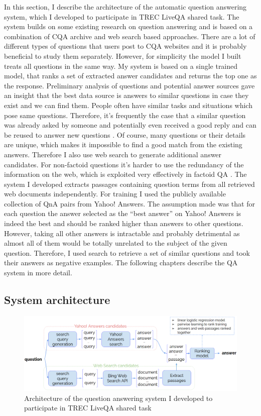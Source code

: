 In this section, I describe the architecture of the automatic question answering system, which I developed to participate in TREC LiveQA shared task.
The system builds on some existing research on question answering and is based on a combination of CQA archive and web search based approaches.
There are a lot of different types of questions that users post to CQA websites and it is probably beneficial to study them separately.
However, for simplicity the model I built treats all questions in the same way.
My system is based on a single trained model, that ranks a set of extracted answer candidates and returns the top one as the response.
Preliminary analysis of questions and potential answer sources gave an insight that the best data source is answers to similar questions in case they exist and we can find them.
People often have similar tasks and situations which pose same questions.
Therefore, it's frequently the case that a similar question was already asked by someone and potentially even received a good reply and can be reused to answer new questions \cite{Shtok:2012:LPA:2187836.2187939}.
Of course, many questions or their details are unique, which makes it impossible to find a good match from the existing answers.
Therefore I also use web search to generate additional answer candidates.
For non-factoid questions it's harder to use the redundancy of the information on the web, which is exploited very effectively in factoid QA \cite{lin2007exploration}.
The system I developed extracts passages containing question terms from all retrieved web documents independently.
For training I used the publicly available collection of QnA pairs from Yahoo! Answers.
The assumption made was that for each question the answer selected as the ``best answer'' on Yahoo! Answers is indeed the best and should be ranked higher than answers to other questions.
However, taking all other answers is intractable and probably detrimental as almost all of them would be totally unrelated to the subject of the given question.
Therefore, I used search to retrieve a set of similar questions and took their answers as negative examples.
The following chapters describe the QA system in more detail.

\subsection{System architecture}
\label{section:non-factoid:liveqa:architecture}

\begin{figure}
	\includegraphics[width=\textwidth]{img/liveqa_qa_model}
	\caption{Architecture of the question answering system I developed to participate in TREC LiveQA shared task}
	\label{figure:non-factoid:liveqa:qa_model}
\end{figure}

